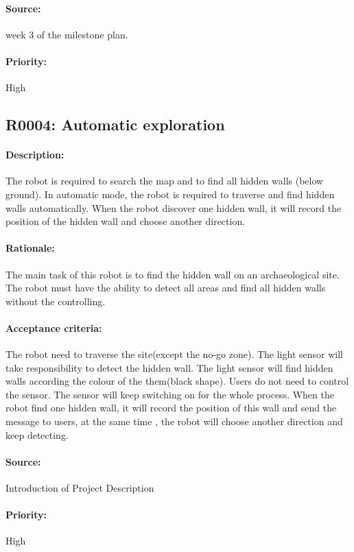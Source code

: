 \documentclass[11pt, a4paper]{report}
\begin{document}
\paragraph{Source:}
 week 3 of the milestone plan. 
\paragraph{Priority:}
High



\subsection{R0004: Automatic exploration}
\paragraph{Description:}
The robot is required to search the map and to find all hidden walls (below ground). In automatic mode, the robot is required to traverse and find hidden walls automatically. When the robot discover one hidden wall, it will record the position of the hidden wall and choose another direction.
\paragraph{Rationale:}
The main task of this robot is to find the hidden wall on an archaeological site. The robot must have the ability to detect all areas and find all hidden walls without the controlling.   
\paragraph{Acceptance criteria:}
The robot need to traverse the site(except the no-go zone). The light sensor will take responsibility to detect the hidden wall. The light sensor will find hidden walls according the colour of the them(black shape). Users do not need to control the sensor. The sensor will keep switching on for the whole process. When the robot find one hidden wall, it will record the position of this wall and send the message to users, at the same time , the robot will choose another direction and keep detecting.  
\paragraph{Source:}
 Introduction of Project Description
\paragraph{Priority:}
High
\end{document}
